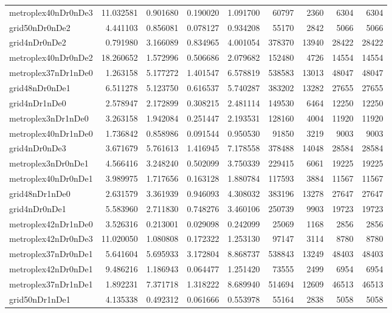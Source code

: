 \begin{longtable}{|l|r|r|r|r|r|r|r|r|}
metroplex40nDr0nDe3 & 11.032581 & 0.901680 & 0.190020 & 1.091700 & 60797 & 2360 & 6304 & 6304 \\
grid50nDr0nDe2 & 4.441103 & 0.856081 & 0.078127 & 0.934208 & 55170 & 2842 & 5066 & 5066 \\
grid4nDr0nDe2 & 0.791980 & 3.166089 & 0.834965 & 4.001054 & 378370 & 13940 & 28422 & 28422 \\
metroplex40nDr0nDe2 & 18.260652 & 1.572996 & 0.506686 & 2.079682 & 152480 & 4726 & 14554 & 14554 \\
metroplex37nDr1nDe0 & 1.263158 & 5.177272 & 1.401547 & 6.578819 & 538583 & 13013 & 48047 & 48047 \\
grid48nDr0nDe1 & 6.511278 & 5.123750 & 0.616537 & 5.740287 & 383202 & 13282 & 27655 & 27655 \\
grid4nDr1nDe0 & 2.578947 & 2.172899 & 0.308215 & 2.481114 & 149530 & 6464 & 12250 & 12250 \\
metroplex3nDr1nDe0 & 3.263158 & 1.942084 & 0.251447 & 2.193531 & 128160 & 4004 & 11920 & 11920 \\
metroplex40nDr1nDe0 & 1.736842 & 0.858986 & 0.091544 & 0.950530 & 91850 & 3219 & 9003 & 9003 \\
grid4nDr0nDe3 & 3.671679 & 5.761613 & 1.416945 & 7.178558 & 378488 & 14048 & 28584 & 28584 \\
metroplex3nDr0nDe1 & 4.566416 & 3.248240 & 0.502099 & 3.750339 & 229415 & 6061 & 19225 & 19225 \\
metroplex40nDr0nDe1 & 3.989975 & 1.717656 & 0.163128 & 1.880784 & 117593 & 3884 & 11567 & 11567 \\
grid48nDr1nDe0 & 2.631579 & 3.361939 & 0.946093 & 4.308032 & 383196 & 13278 & 27647 & 27647 \\
grid4nDr0nDe1 & 5.583960 & 2.711830 & 0.748276 & 3.460106 & 250739 & 9903 & 19723 & 19723 \\
metroplex42nDr1nDe0 & 3.526316 & 0.213001 & 0.029098 & 0.242099 & 25069 & 1168 & 2856 & 2856 \\
metroplex42nDr0nDe3 & 11.020050 & 1.080808 & 0.172322 & 1.253130 & 97147 & 3114 & 8780 & 8780 \\
metroplex37nDr0nDe1 & 5.641604 & 5.695933 & 3.172804 & 8.868737 & 538843 & 13249 & 48403 & 48403 \\
metroplex42nDr0nDe1 & 9.486216 & 1.186943 & 0.064477 & 1.251420 & 73555 & 2499 & 6954 & 6954 \\
metroplex37nDr1nDe1 & 1.892231 & 7.371718 & 1.318222 & 8.689940 & 514694 & 12609 & 46513 & 46513 \\
grid50nDr1nDe1 & 4.135338 & 0.492312 & 0.061666 & 0.553978 & 55164 & 2838 & 5058 & 5058 \\

\end{longtable}
